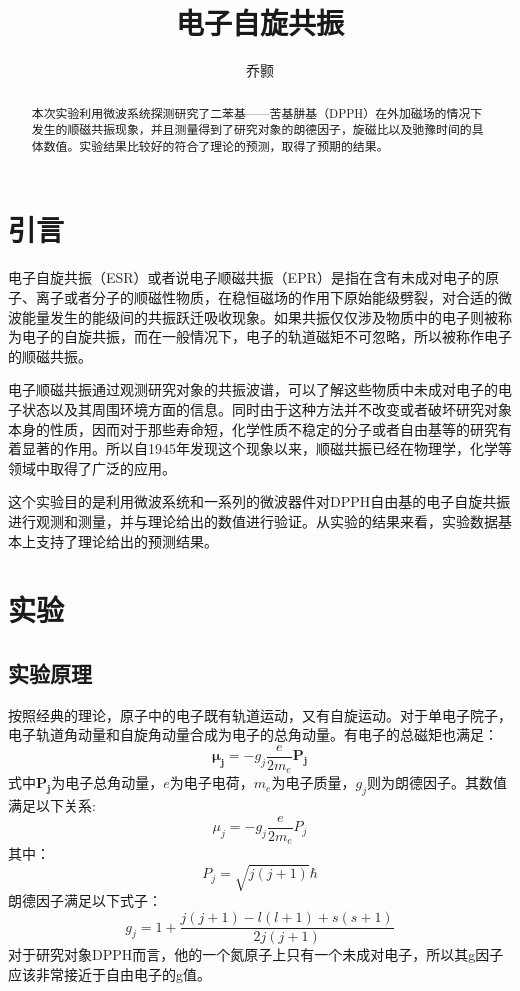 \documentclass[aps,pre,12pt,preprint,onecolumn,showpacs,showkeys,UTF8]{revtex4-1}
\begin{document}
\title{\bf\heiti{}电子自旋共振\vspace{15mm}}
\author{\fangsong 乔颢\vspace{2mm}}
\begin{abstract}
	\vspace{10mm}
	\begin{spacing}{1.5}
		\songti{}
		本次实验利用微波系统探测研究了二苯基——苦基肼基（DPPH）在外加磁场的情况下发生的顺磁共振现象，并且测量得到了研究对象的朗德因子，旋磁比以及驰豫时间的具体数值。实验结果比较好的符合了理论的预测，取得了预期的结果。
	\end{spacing}
\end{abstract}

\maketitle

\section{引言}
电子自旋共振（ESR）或者说电子顺磁共振（EPR）是指在含有未成对电子的原子、离子或者分子的顺磁性物质，在稳恒磁场的作用下原始能级劈裂，对合适的微波能量发生的能级间的共振跃迁吸收现象。如果共振仅仅涉及物质中的电子则被称为电子的自旋共振，而在一般情况下，电子的轨道磁矩不可忽略，所以被称作电子的顺磁共振。

电子顺磁共振通过观测研究对象的共振波谱，可以了解这些物质中未成对电子的电子状态以及其周围环境方面的信息。同时由于这种方法并不改变或者破坏研究对象本身的性质，因而对于那些寿命短，化学性质不稳定的分子或者自由基等的研究有着显著的作用。所以自1945年发现这个现象以来，顺磁共振已经在物理学，化学等领域中取得了广泛的应用\cite{Book}。

这个实验目的是利用微波系统和一系列的微波器件对DPPH自由基的电子自旋共振进行观测和测量，并与理论给出的数值进行验证。从实验的结果来看，实验数据基本上支持了理论给出的预测结果。

\section{实验}
\subsection{实验原理}
按照经典的理论，原子中的电子既有轨道运动，又有自旋运动。对于单电子院子，电子轨道角动量和自旋角动量合成为电子的总角动量。有电子的总磁矩也满足：
\begin{equation}
	\bm{\mu_j}=-g_j\frac{e}{2m_e}\bm{P_j}
\end{equation}
式中$\bm{P_j}$为电子总角动量，$e$为电子电荷，$m_e$为电子质量，$g_j$则为朗德因子。其数值满足以下关系:
\begin{equation}
	\mu_j=-g_j\frac{e}{2m_e}P_j	
\end{equation}
其中：
$$P_j=\sqrt{j(j+1)}\hbar$$
朗德因子满足以下式子：
$$g_j=1+\frac{j(j+1)-l(l+1)+s(s+1)}{2j(j+1)}$$
对于研究对象DPPH而言，他的一个氮原子上只有一个未成对电子，所以其g因子应该非常接近于自由电子的g值。
\end{document}
